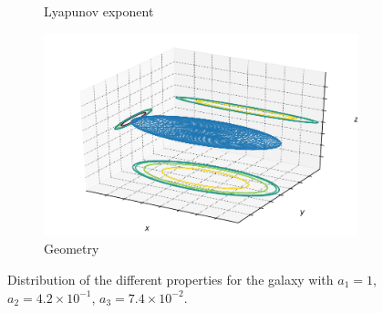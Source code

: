 \begin{figure}[h]
\begin{subfigure}[t]{0.4\textwidth}
        \caption{Lyapunov exponent}
    \end{subfigure}
    \begin{subfigure}[t]{0.4\textwidth}
        \includegraphics[width=\textwidth]{"../Files/Week 13/images/9_ellipsoid"}
        \caption{Geometry}
    \end{subfigure}
    \caption{Distribution of the different properties for the galaxy with $a_1 = 1$, $a_2 = 4.2\times10^{-1}$, $a_3 = 7.4\times10^{-2}$.}
\end{figure}


